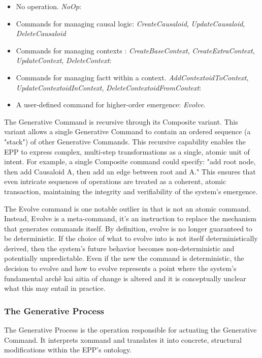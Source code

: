 \begin{itemize}
	\item No operation. \textit{NoOp}:
	\item  Commands for managing causal logic: \textit{CreateCausaloid}, \textit{UpdateCausaloid}, \textit{DeleteCausaloid}
	\item Commands for managing contexts : \textit{CreateBaseContext}, \textit{CreateExtraContext}, \textit{UpdateContext}, \textit{DeleteContext}:
	\item Commands for managing factt within a context. \textit{AddContextoidToContext}, \textit{UpdateContextoidInContext}, \textit{DeleteContextoidFromContext}:
	\item A user-defined command for higher-order emergence: \textit{Evolve}.
\end{itemize}

The Generative Command is recursive through its Composite variant. This variant allows a single Generative Command to contain an ordered sequence (a "stack") of other  Generative Commands. This recursive capability enables the EPP to express complex, multi-step transformations as a single, atomic unit of intent. For example, a single Composite command could specify: "add root node, then add Causaloid A, then add an edge between root and A." This ensures that even intricate sequences of operations are treated as a coherent, atomic transaction, maintaining the integrity and verifiability of the system's emergence.  

The Evolve command is one notable outlier in that is not an atomic command. Instead, Evolve is a meta-command, it’s an instruction to replace the mechanism that generates commands itself. By definition, evolve is no longer guaranteed to be  deterministic.  If the choice of what to evolve into is not itself deterministically derived, then the system's future behavior becomes non-deterministic and potentially unpredictable. Even if the new the command is deterministic, the decision to evolve and how to evolve represents a point where the system's fundamental archê kai aitia of change is altered and it is conceptually unclear what this may entail in practice. 

\subsubsection{The Generative Process}
\label{sec:ontology_emgerence_gen_process}

The Generative Process is the operation responsible for actuating the Generative Command. It interprets xommand and translates it into concrete, structural modifications within the EPP's ontology. 

